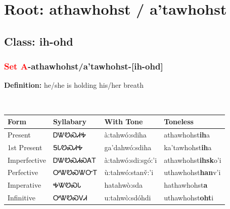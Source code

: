 \needspace{4in}
\section*{Root: athawhohst / a'tawhohst}
\nopagebreak
{}
\needspace{3in}
\subsection*{Class: ih-ohd}
\nopagebreak
\needspace{2in}
\subsubsection*{\textcolor{Red}{Set A}{-}\textbf{athawhohst/a'tawhohst}{-}[ih-ohd]}
\nopagebreak
\textbf{Definition: } he/she is holding his/her breath
\\[0.5em]
\begin{tabularx}{\textwidth}{l X X X}%
\toprule%
\textbf{Form}&\textbf{Syllabary}&\textbf{With Tone}&\textbf{Toneless}\\%
\midrule%
Present&ᎠᏔᏬᏍᏗᎭ&à:tahwó:sdiha&athawhohst\textbf{ih}a\\%
1st Present&ᎦᏓᏬᏍᏗᎭ&ga’dahwó:sdiha&ka'tawhohst\textbf{ih}a\\%
Imperfective&ᎠᏔᏬᏍᏗᏍᎪᎢ&à:tahwó:sdi:sgó:’i&athawhohst\textbf{ihsk}o'i\\%
Perfective&ᎤᏔᏬᏍᏔᏅᎢ&ù:tahwó:stanv̌:’i&uthawhohst\textbf{han}v'i\\%
Imperative&ᎭᏔᏬᏍᏓ&hatahwò:sda&hathawhohst\textbf{a}\\%
Infinitive&ᎤᏔᏬᏍᏙᏗ&u:tahwò:sdóhdi&uthawhohst\textbf{oht}i\\%
\bottomrule%
\end{tabularx}
\\[1em]